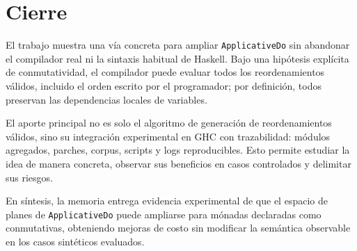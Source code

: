 
\section{Cierre}

El trabajo muestra una vía concreta para ampliar \texttt{ApplicativeDo} sin abandonar el compilador real ni la sintaxis habitual de \textsf{Haskell}. Bajo una hipótesis explícita de conmutatividad, el compilador puede evaluar todos los reordenamientos válidos, incluido el orden escrito por el programador; por definición, todos preservan las dependencias locales de variables.

El aporte principal no es solo el algoritmo de generación de reordenamientos válidos, sino su integración experimental en \textsf{GHC} con trazabilidad: módulos agregados, parches, corpus, scripts y logs reproducibles. Esto permite estudiar la idea de manera concreta, observar sus beneficios en casos controlados y delimitar sus riesgos.

En síntesis, la memoria entrega evidencia experimental de que el espacio de planes de \texttt{ApplicativeDo} puede ampliarse para mónadas declaradas como conmutativas, obteniendo mejoras de costo sin modificar la semántica observable en los casos sintéticos evaluados.
